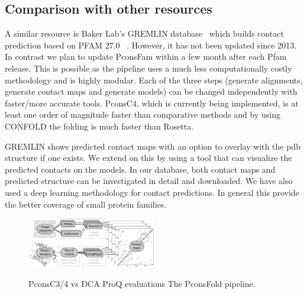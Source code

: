 \documentclass[a4,center,fleqn]{NAR}
\begin{document}
\subsection{Comparison with other resources}

A similar resource is Baker Lab’s GREMLIN database~\cite{Kamisetty2013} which builds contact prediction based on
PFAM 27.0~\cite{Sonnhammer:1997} . However, it has not been updated since
2013. In contrast we plan to update PconsFam within a few month after
each Pfam release. This is possible as the pipeline uses a much less
computationally costly methodology and is highly modular. Each of the three steps
(generate alignments, generate contact maps and generate models) can be changed
independently with faster/more accurate tools. PconsC4, which is currently
being implemented, is at least one order of
magnitude faster than comparative methods and by using CONFOLD the
folding is much faster than Rosetta.


GREMLIN shows predicted contact maps with an option to overlay with
the pdb structure if one exists. We extend on this by using a tool
that can visualize the predicted contacts on the models. In our
database, both contact maps and predicted structure can be
investigated in detail and downloaded.  We have also used a deep
learning methodology for contact predictions. In general this provide
the better coverage of small protein families.




\begin{figure}[t]
\begin{center}
\end{center}
\caption{PconsC3/4 vs DCA
ProQ evaluations 
The PconsFold pipeline.}
    \includegraphics[width=0.5\textwidth]{figures/flowchart.eps}
\label{fig:Pipeline}
\end{figure}
\end{document}
